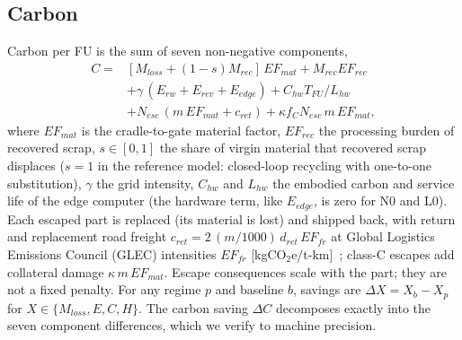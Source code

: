 \subsection{Carbon}
Carbon per FU is the sum of seven non-negative components,
\begin{equation}
\begin{split}
C ={}& [M_{loss}+(1-s)M_{rec}]\,EF_{mat} + M_{rec}EF_{rec} \\
& + \gamma\,(E_{rw}+E_{rev}+E_{edge}) + C_{hw}T_{FU}/L_{hw} \\
& + N_{esc}\,(m\,EF_{mat}+c_{ret}) + \kappa f_C N_{esc}\, m\,EF_{mat},
\end{split}
\end{equation}
where $EF_{mat}$ is the cradle-to-gate material factor, $EF_{rec}$ the processing burden of recovered scrap, $s\in[0,1]$ the share of virgin material that recovered scrap displaces ($s=1$ in the reference model: closed-loop recycling with one-to-one substitution), $\gamma$ the grid intensity, $C_{hw}$ and $L_{hw}$ the embodied carbon and service life of the edge computer (the hardware term, like $E_{edge}$, is zero for N0 and L0). Each escaped part is replaced (its material is lost) and shipped back, with return and replacement road freight $c_{ret}=2\,(m/1000)\,d_{ret}\,EF_{fr}$ at Global Logistics Emissions Council (GLEC) intensities $EF_{fr}$ [kgCO$_2$e/t-km]~\cite{glec2023}; class-C escapes add collateral damage $\kappa\, m\,EF_{mat}$. Escape consequences scale with the part; they are not a fixed penalty. For any regime $p$ and baseline $b$, savings are $\Delta X = X_b - X_p$ for $X\in\{M_{loss},E,C,H\}$. The carbon saving $\Delta C$ decomposes exactly into the seven component differences, which we verify to machine precision.

